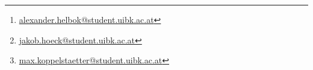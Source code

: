 \thispagestyle{empty}
\titlehead{\texttt{[image: logo.jpg]}}
\title{\settitle}
\author{Alexander Helbok\thanks{\href{mailto:alexander.helbok@student.uibk.ac.at}{alexander.helbok@student.uibk.ac.at}},
		Jakob Höck \thanks{\href{mailto:jakob.hoeck@student.uibk.ac.at}{jakob.hoeck@student.uibk.ac.at}},
		Max Koppelstätter\thanks{\href{mailto:max.koppelstaetter@student.uibk.ac.at}{max.koppelstaetter@student.uibk.ac.at}}}
\date{\today}
\maketitle
\vfill 
